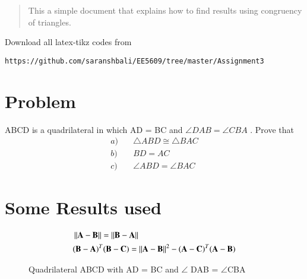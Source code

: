 \documentclass[journal,12pt,twocolumn]{IEEEtran}
\begin{document}
%
\begin{abstract}
This a simple document that explains how to find results using congruency of triangles.
\end{abstract}
%
%
Download all latex-tikz codes from 
%
\begin{lstlisting}
https://github.com/saranshbali/EE5609/tree/master/Assignment3
\end{lstlisting}
%
\section{Problem}
ABCD is a quadrilateral in which AD = BC and $\angle{DAB}  = \angle{CBA}$ . Prove that
\begin{align}
a) & \quad	\triangle ABD \cong \triangle BAC \\
b) & \quad BD = AC \\ 
c) & \quad \angle ABD = \angle BAC
\end{align}
\section{Some Results used}
\begin{align}
 & \left\lVert\mathbf{A}-\mathbf{B}\right\rVert  =    \left\lVert\mathbf{B}-\mathbf{A}\right\rVert \\
 & (\mathbf{B}-\mathbf{A})^T(\mathbf{B}-\mathbf{C})  =  \left\lVert\mathbf{A}-\mathbf{B}\right\rVert^2 - (\mathbf{A}-\mathbf{C})^T(\mathbf{A}-\mathbf{B}) 
\end{align}
\begin{figure}[!htb]
	\centering
	\centering
	\resizebox{\columnwidth}{!}{}
	\caption{Quadrilateral ABCD with AD = BC and $\angle$ DAB = $\angle$CBA}
\end{figure}
\end{document}
